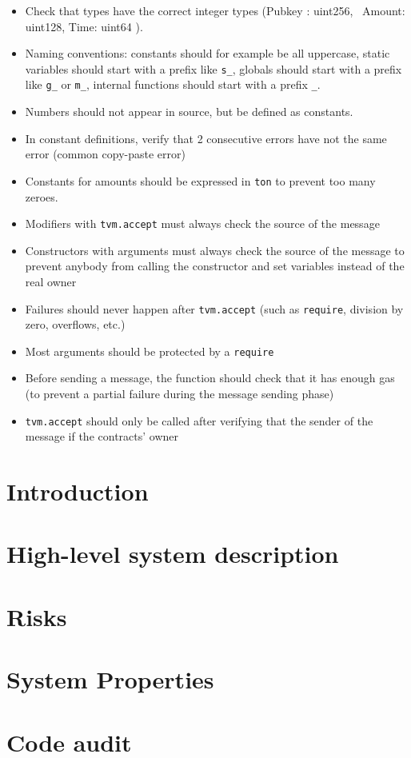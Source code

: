 \documentclass{report}
\begin{document}
\begin{itemize}
\item Check that types have the correct integer types (Pubkey : uint256, \
   Amount: uint128, Time: uint64 ).
\item Naming conventions: constants should for example be all uppercase, static variables should start with a prefix like \verb+s_+, globals should start with a prefix like \verb+g_+ or \verb+m_+, internal functions should start with a prefix \verb+_+.
\item Numbers should not appear in source, but be defined as constants.
\item In constant definitions, verify that 2 consecutive errors have not the same error (common copy-paste error)
\item Constants for amounts should be expressed in \verb+ton+ to prevent too many zeroes.
\item Modifiers with {\tt tvm.accept} must always check the source of the message
\item Constructors with arguments must always check the source of the message to prevent anybody from calling the constructor and set variables instead of the real owner
\item Failures should never happen after {\tt tvm.accept} (such as {\tt require}, division by zero, overflows, etc.)
\item Most arguments should be protected by a {\tt require}
\item Before sending a message, the function should check that it has enough gas (to prevent a partial failure during the message sending phase)
\item {\tt tvm.accept} should only be called after verifying that the sender of the message if the contracts' owner
\end{itemize}
\fi

\chapter{Introduction}


\chapter{High-level system description}


\chapter{Risks}


\chapter{System Properties}


\chapter{Code audit}

\end{document}
